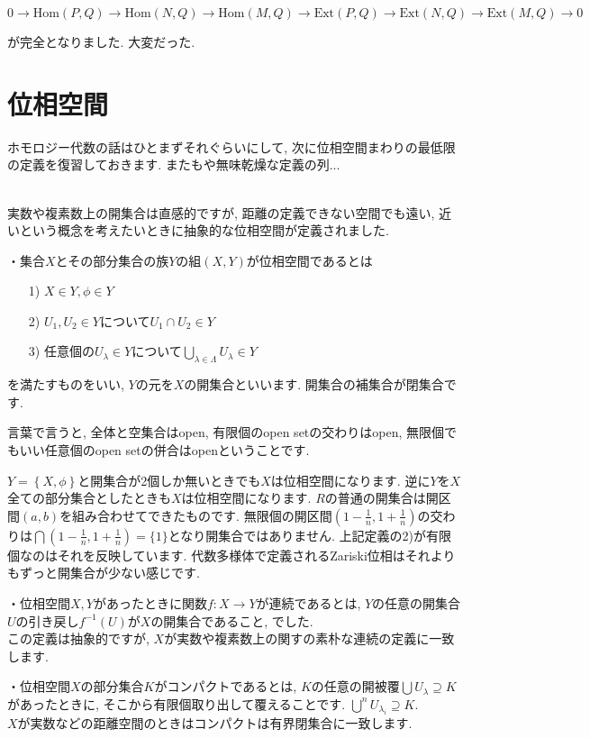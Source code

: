 \documentclass{jsarticle}
\def\Hom{\mathrm{Hom}}
\def\Ext{\mathrm{Ext}}
\theoremstyle{definition}
\numberwithin{theorem}{section}
\begin{document}
\begin{equation*}
0 \rightarrow \Hom(P, Q) \rightarrow \Hom(N, Q) \rightarrow \Hom(M, Q) \rightarrow \Ext(P, Q) \rightarrow \Ext(N, Q) \rightarrow \Ext(M, Q) \rightarrow 0
\end{equation*}

が完全となりました. 大変だった. 

\section{位相空間}
ホモロジー代数の話はひとまずそれぐらいにして, 次に位相空間まわりの最低限の定義を復習しておきます. またもや無味乾燥な定義の列...

\hrulefill\\

実数や複素数上の開集合は直感的ですが, 距離の定義できない空間でも遠い, 近いという概念を考えたいときに抽象的な位相空間が定義されました.

・集合$X$とその部分集合の族$Y$の組$(X, Y)$が位相空間であるとは
\begin{itemize}
\item[1)] $X \in Y, \phi \in Y$
\item[2)] $U_1, U_2 \in Y$について$U_1 \cap U_2 \in Y$
\item[3)] 任意個の$U_\lambda \in Y$について$\bigcup_{\lambda \in \Lambda} U_\lambda \in Y$
\end{itemize}
を満たすものをいい, $Y$の元を$X$の開集合といいます. 開集合の補集合が閉集合です.

言葉で言うと, 全体と空集合はopen, 有限個のopen setの交わりはopen, 無限個でもいい任意個のopen setの併合はopenということです.

$Y = \left\{X, \phi \right\}$と開集合が2個しか無いときでも$X$は位相空間になります. 逆に$Y$を$X$全ての部分集合としたときも$X$は位相空間になります.
$R$の普通の開集合は開区間$(a, b)$を組み合わせてできたものです. 無限個の開区間$\displaystyle (1-\frac{1}{n}, 1+\frac{1}{n})$の交わりは$\displaystyle\bigcap(1-\frac{1}{n}, 1+\frac{1}{n}) = \{1\}$となり開集合ではありません. 上記定義の2)が有限個なのはそれを反映しています. 代数多様体で定義されるZariski位相はそれよりもずっと開集合が少ない感じです.

・位相空間$X, Y$があったときに関数$f: X \rightarrow Y$が連続であるとは, $Y$の任意の開集合$U$の引き戻し$f^{-1}(U)$が$X$の開集合であること, でした.\\
この定義は抽象的ですが, $X$が実数や複素数上の関すの素朴な連続の定義に一致します.

・位相空間$X$の部分集合$K$がコンパクトであるとは, $K$の任意の開被覆$\bigcup U_\lambda \supseteq K$があったときに, そこから有限個取り出して覆えることです. $\bigcup^n U_{\lambda_i} \supseteq K$.\\
$X$が実数などの距離空間のときはコンパクトは有界閉集合に一致します.
\end{document}
